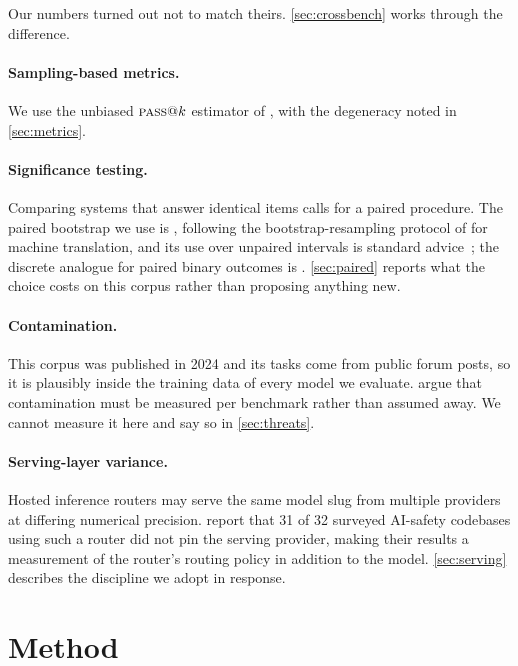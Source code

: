 \documentclass[11pt]{article}
\newcommand{\pass}{\textsc{pass}}
\begin{document}
Our numbers turned out not to match theirs. \cref{sec:crossbench} works
through the difference.

\paragraph{Sampling-based metrics.}
We use the unbiased $\pass{}@k$ estimator of \citet{chen2021codex}, with the
degeneracy noted in \cref{sec:metrics}.

\paragraph{Significance testing.}
Comparing systems that answer identical items calls for a paired procedure.
The paired bootstrap we use is \citet{bergkirkpatrick2012empirical},
following the bootstrap-resampling protocol of \citet{koehn2004bootstrap} for
machine translation, and its use over unpaired intervals is standard
advice~\citep{dror2018hitchhiker}; the discrete analogue for paired binary
outcomes is \citet{mcnemar1947note}. \cref{sec:paired} reports what the
choice costs on this corpus rather than proposing anything new.

\paragraph{Contamination.}
This corpus was published in 2024 and its tasks come from public forum posts,
so it is plausibly inside the training data of every model we evaluate.
\citet{sainz2023contamination} argue that contamination must be measured per
benchmark rather than assumed away. We cannot measure it here and say so in
\cref{sec:threats}.

\paragraph{Serving-layer variance.}
Hosted inference routers may serve the same model slug from multiple
providers at differing numerical precision. \citet{openrouterpinning} report
that 31 of 32 surveyed AI-safety codebases using such a router did not pin
the serving provider, making their results a measurement of the router's
routing policy in addition to the model. \cref{sec:serving} describes the
discipline we adopt in response.

\section{Method}
\end{document}
